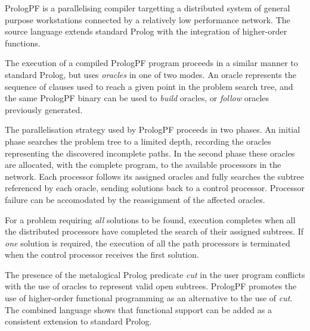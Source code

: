 PrologPF is a parallelising compiler targetting a distributed system of general purpose
workstations connected by a relatively low performance network.  The source language
extends standard Prolog with the integration of higher-order functions.

The execution of a compiled PrologPF program proceeds in a similar manner to
standard Prolog, but uses \textit{oracles} in one of two modes.  An oracle
represents the sequence of clauses used to reach a given point in the problem
search tree, and the same PrologPF binary can be used to \textit{build} oracles,
or \textit{follow} oracles previously generated.

The parallelisation strategy used by PrologPF proceeds in two phases.  An
initial phase searches the problem tree to a limited depth, recording the oracles
representing the discovered incomplete paths.  
In the second phase these oracles are allocated, with
the complete program, to the available processors in the network.  Each processor
follows its assigned oracles and fully searches the subtree referenced by each
oracle, sending solutions back to a control processor.  Processor failure can
be accomodated by the reassignment of the affected oracles.

For a problem requiring \textit{all} solutions to be found, execution completes
when all the distributed processors have completed the search of their assigned
subtrees.  If \textit{one} solution is required, the execution of all the path
processors is terminated when the control processor receives the first
solution.

The presence of the metalogical Prolog predicate \textit{cut} in the user
program conflicts with the use of oracles to represent valid open subtrees.
PrologPF promotes the use of higher-order functional programming as an
alternative to the use of \textit{cut}.  The combined language shows that
functional support can be added as a consistent extension to standard Prolog.
